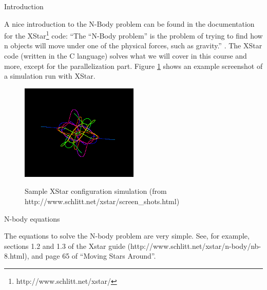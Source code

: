 
 {Introduction}
\label{sec:naive-nbody}

A nice introduction to the N-Body problem can be found in the documentation for
the XStar\footnote{http://www.schlitt.net/xstar/} code: ``The ``N-Body problem''
is the problem of trying to find how n objects will move under one of the
physical forces, such as gravity.'' \cite{Schlitt_2000}. The XStar code (written
in the C language) solves what we will cover in this course and more, except for
the parallelization part. Figure \ref{fig:xstar1} shows an example screenshot of
a simulation run with XStar.

\begin{figure}[!htbp]
  \centering
  \includegraphics[width=0.5\textwidth]{graphics/xstar1.png}
  \label{fig:xstar1}
  \caption{Sample XStar configuration simulation (from http://www.schlitt.net/xstar/screen\_shots.html)}
\end{figure}


 {N-body equations}
\label{sec:nbody-equation}


The equations to solve the N-body problem are very simple. See, for example,
sections 1.2 and 1.3 of the Xstar guide
(http://www.schlitt.net/xstar/n-body/nb-8.html), and page 65 of ``Moving Stars
Around''.

